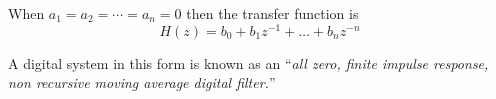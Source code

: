 When $a_1 = a_2 = \cdots = a_n = 0$ then the transfer function is
\[H(z) = b_0 + b_{1}z^{-1} + \ldots + b_n
z^{-n}\]


A digital system in this form is known as an ``\emph{all zero,
finite impulse response, non recursive moving average digital
filter.}''
\endinput
